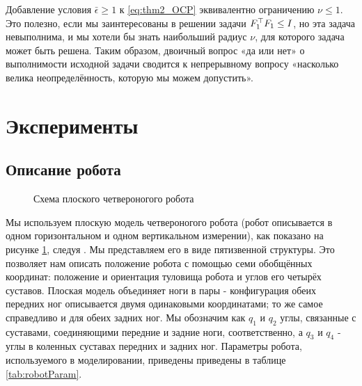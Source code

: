 \begin{remark}
	\label{rm:nu_trick}
	Добавление условия $\bar{\epsilon}\geq 1$ к \eqref{eq:thm2_OCP} эквивалентно ограничению $\nu \leq 1$. Это полезно, если мы заинтересованы в решении задачи ${F}_1^\top{F}_1 \leq {I}$, но эта задача невыполнима, и мы хотели бы знать наибольший радиус $\nu$, для которого задача может быть решена. Таким образом, двоичный вопрос «да или нет» о выполнимости исходной задачи сводится к непрерывному вопросу «насколько велика неопределённость, которую мы можем допустить».
\end{remark}

\section{Эксперименты}\label{sec:ch3/sect3}

\subsection{Описание робота}\label{sec:ch3/sect3/sub1}
\begin{figure}[ht]
	\caption{Схема плоского четвероногого робота}\label{fig:robotSagital}
\end{figure} 
Мы используем плоскую модель четвероногого робота (робот описывается в одном горизонтальном и одном вертикальном измерении), как показано на рисунке \ref{fig:robotSagital}, следуя \cite{RobotConfig}. Мы представляем его в виде пятизвенной структуры. Это позволяет нам описать положение робота с помощью семи обобщённых координат: положение и ориентация туловища робота и углов его четырёх суставов. Плоская модель объединяет ноги в пары - конфигурация обеих передних ног описывается двумя одинаковыми координатами; то же самое справедливо и для обеих задних ног. Мы обозначим как $q_1$ и $q_2$ углы, связанные с суставами, соединяющими передние и задние ноги, соответственно, а $q_3$ и $q_4$ - углы в коленных суставах передних и задних ног. Параметры робота, используемого в моделировании, приведены приведены в таблице \ref{tab:robotParam}.

